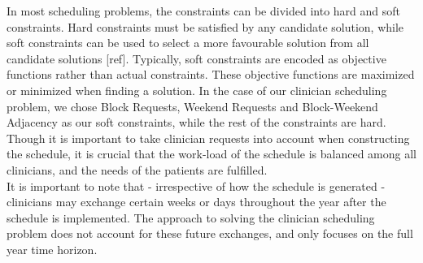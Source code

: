In most scheduling problems, the constraints can be divided into hard and soft constraints. Hard constraints must be satisfied by any candidate solution, while soft constraints can be used to select a more favourable solution from all candidate solutions [ref]. Typically, soft constraints are encoded as objective functions rather than actual constraints. These objective functions are maximized or minimized when finding a solution. In the case of our clinician scheduling problem, we chose Block Requests, Weekend Requests and Block-Weekend Adjacency as our soft constraints, while the rest of the constraints are hard. Though it is important to take clinician requests into account when constructing the schedule, it is crucial that the work-load of the schedule is balanced among all clinicians, and the needs of the patients are fulfilled. \\

It is important to note that - irrespective of how the schedule is generated - clinicians may exchange certain weeks or days throughout the year after the schedule is implemented. The approach to solving the clinician scheduling problem does not account for these future exchanges, and only focuses on the full year time horizon.